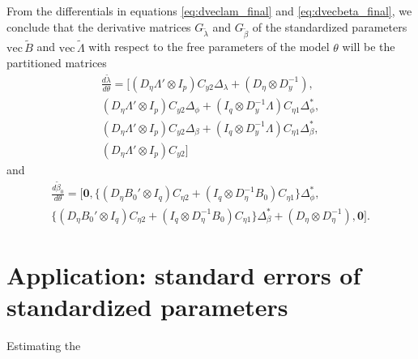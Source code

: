 \documentclass[a4paper, 11pt]{article}
\newcommand{\n}{\eta}
\renewcommand{\l}{\lambda}
\renewcommand{\b}{\beta}
\newcommand{\p}{\phi}
\newcommand{\kronprod}{\otimes}
\renewcommand{\vec}{\mathrm{vec}\,}
\newcommand{\Lambdastan}{\tilde{\Lambda}}
\newcommand{\Bstan}{\tilde{B}}
\newcommand{\0}{\boldsymbol{0}}
\begin{document}
From the differentials in equations \ref{eq:dveclam_final} and
\ref{eq:dvecbeta_final},
we conclude that the derivative matrices  $G_{\tilde{\l}}$ and 
$G_{\tilde{\b}}$ of the standardized parameters $\vec \Bstan$ and 
$\vec \Lambdastan$ with respect to the free parameters of the model 
$\theta$ will be the partitioned matrices
\begin{multline}
\frac{d \tilde\l}{d \theta} = [
        (D_\n \Lambda' \kronprod I_p) C_{y2} \Delta_\l + 
            (D_\n \kronprod D_y^{-1}), \\
        (D_\n \Lambda' \kronprod I_p) C_{y2} \Delta_\p +
         (I_q \kronprod D_y^{-1}\Lambda) C_{\n1} \Delta^*_\p, \\
        (D_\n \Lambda' \kronprod I_p) C_{y2} \Delta_\b + 
            (I_q \kronprod D_y^{-1}\Lambda) C_{\n1} \Delta^*_\b,\\
        (D_\n \Lambda' \kronprod I_p) C_{y2}  
 ] 
\end{multline}
and
\begin{multline}
\frac{d \tilde\b_0}{d \theta} = [
        \0,
        \{(D_\n B_0' \kronprod I_q) C_{\n2}  + 
            (I_q \kronprod D_\n^{-1}B_0) C_{\n1} \} \Delta^*_\p
            ,\\
        \{(D_\n B_0' \kronprod I_q) C_{\n2}  + 
            (I_q \kronprod D_\n^{-1}B_0) C_{\n1} \} \Delta^*_\b +
            (D_\n \kronprod D_\n^{-1})
            ,
        \0
 ] .
\end{multline}


\section{Application: standard errors of standardized parameters}

Estimating the 
\end{document}
